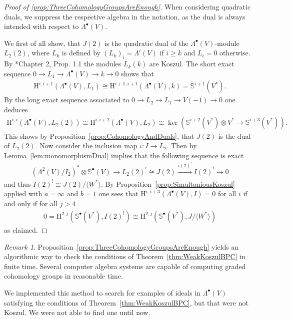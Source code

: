 \documentclass{amsart}
\theoremstyle{definition}
\theoremstyle{remark}
\newtheorem{rem}[thm]{Remark}
\newcommand{\rmH}{\mathrm{H}}
\numberwithin{equation}{section}
\begin{document}
\begin{proof}[Proof of \ref{prop:ThreeCohomologyGroupsAreEnough}]
    When considering quadratic duals, we suppress the respective algebra in the notation, as the dual is always intended with respect to $\Lambda^\bullet(V)$.
    
    We first of all show, that $J(2)$ is the quadratic dual of the $\Lambda^\bullet(V)$-module $L_2(2)$, where $L_k$ is defined by $(L_k)_i=\Lambda^i(V)$ if $i\geq k$ and $L_i=0$ otherwise. By \cite{PositselskiPolishchuk2005}*{Chapter 2, Prop. 1.1} the modules $L_k(k)$ are Koszul. The short exact sequence $0\to L_1\to \Lambda^\bullet(V)\to k\to 0$ shows that
    \begin{align*}
        \rmH^{i,i+1}(\Lambda^\bullet(V),L_1)\cong \rmH^{i+1,i+1}(\Lambda^\bullet(V),k)=\mathbb{S}^{i+1}(V^*).
    \end{align*}
    By the long exact sequence associated to $0\to L_2\to L_1\to V(-1)\to 0$ one deduces
    \begin{align}
    \label{eq:truncatedDual}
        \rmH^{i,i}(\Lambda^\bullet(V),L_2(2))\cong \rmH^{i,i+2}(\Lambda^\bullet(V),L_2)\cong \ker (\mathbb{S}^{i+2}(V^*)\otimes V^*\to \mathbb{S}^{i+3}(V^*)).
    \end{align}
    This shows by Proposition~\ref{prop:CohomologyAndDuals}, that $J(2)$ is the dual of $L_2(2)$. Now consider the inclusion map $\iota:I\to L_2$. Then by Lemma~\ref{lem:monomorphismDual} implies that the following sequence is exact
    \begin{align*}
        (\Lambda^2(V)/I_2)^*\otimes \mathbb{S}^\bullet(V)\longrightarrow L_2(2)^!\cong J(2)\overset{\iota(2)^!}\longrightarrow I(2)^!\longrightarrow 0
    \end{align*}
    and thus $I(2)^!\cong J(2)/\langle W^*\rangle$. By Proposition~\ref{prop:SimultaniousKoszul} applied with $a=\infty$ and $b=1$ one sees that $\rmH^{i,i+3}(\Lambda^\bullet(V),I)=0$ for all $i$ if and only if for all $j>4$
    \begin{align*}
        0=\rmH^{2,j}(\mathbb{S}^\bullet(V^*),I(2)^!)\cong \rmH^{2,j}(\mathbb{S}^\bullet(V^*),J/\langle W^*\rangle )
    \end{align*}
    as claimed.
\end{proof}
\begin{rem}
    Proposition~\ref{prop:ThreeCohomologyGroupsAreEnough} yields an algorithmic way to check the conditions of Theorem~\ref{thm:WeakKoszulBPC} in finite time. Several computer algebra systems are capable of computing graded cohomology groups in reasonable time.

    We implemented this method to search for examples of ideals in $\Lambda^\bullet(V)$ satisfying the conditions of Theorem~\ref{thm:WeakKoszulBPC}, but that were not Koszul. We were not able to find one until now.
\end{rem}
\end{document}
